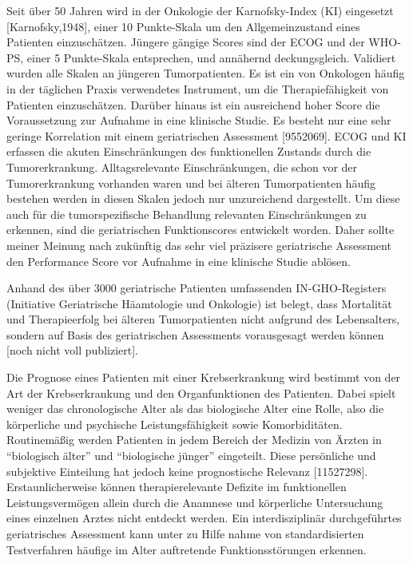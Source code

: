 Seit über 50 Jahren wird in der Onkologie der Karnofsky-Index (KI)
eingesetzt [Karnofsky,1948], einer 10 Punkte-Skala um den
Allgemeinzustand eines Patienten einzuschätzen. Jüngere gängige Scores
sind der ECOG und der WHO-PS, einer 5 Punkte-Skala entsprechen, und
annähernd deckungsgleich. Validiert wurden alle Skalen an jüngeren
Tumorpatienten. Es ist ein von Onkologen häufig in der täglichen
Praxis verwendetes Instrument, um die Therapiefähigkeit von Patienten
einzuschätzen. Darüber hinaus ist ein ausreichend hoher Score die
Voraussetzung zur Aufnahme in eine klinische Studie. Es besteht nur
eine sehr geringe Korrelation mit einem geriatrischen Assessment
[9552069]. ECOG und KI erfassen die akuten Einschränkungen des
funktionellen Zustands durch die Tumorerkrankung. Alltagsrelevante
Einschränkungen, die schon vor der Tumorerkrankung vorhanden waren und
bei älteren Tumorpatienten häufig bestehen werden in diesen Skalen
jedoch nur unzureichend dargestellt. Um diese auch für die
tumorspezifische Behandlung relevanten Einschränkungen zu erkennen,
sind die geriatrischen Funktionscores entwickelt worden. Daher sollte
meiner Meinung nach zukünftig das sehr viel präzisere geriatrische
Assessment den Performance Score vor Aufnahme in eine klinische Studie
ablösen.

Anhand des über 3000 geriatrische Patienten umfassenden
IN-GHO-Registers (Initiative Geriatrische Häamtologie und Onkologie)
ist belegt, dass Mortalität und Therapieerfolg bei älteren
Tumorpatienten nicht aufgrund des Lebensalters, sondern auf Basis des
geriatrischen Assessments vorausgesagt werden können [noch nicht voll
publiziert].

Die Prognose eines Patienten mit einer Krebserkrankung wird bestimmt
von der Art der Krebserkrankung und den Organfunktionen des
Patienten. Dabei spielt weniger das chronologische Alter als das
biologische Alter eine Rolle, also die körperliche und psychische
Leistungsfähigkeit sowie Komorbiditäten. Routinemäßig werden Patienten
in jedem Bereich der Medizin von Ärzten in “biologisch älter” und
“biologische jünger” eingeteilt. Diese persönliche und subjektive
Einteilung hat jedoch keine prognostische Relevanz
[11527298]. Erstaunlicherweise können therapierelevante Defizite im
funktionellen Leistungsvermögen allein durch die Anamnese und
körperliche Untersuchung eines einzelnen Arztes nicht entdeckt
werden. Ein interdisziplinär durchgeführtes geriatrisches Assessment
kann unter zu Hilfe nahme von standardisierten Testverfahren häufige
im Alter auftretende Funktionsstörungen erkennen.

